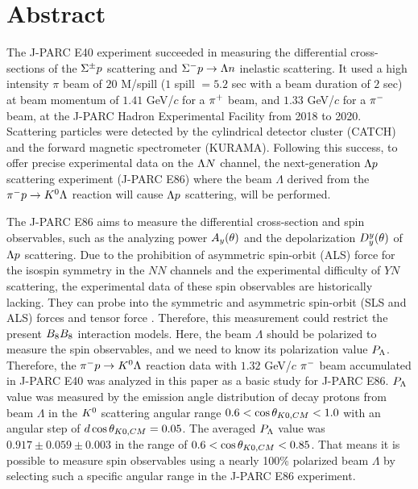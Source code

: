 %

\chapter{Abstract}
The J-PARC E40 experiment succeeded in measuring the differential cross-sections of the $\Sigma^{\pm}p$ scattering and $\Sigma^- p \to \Lambda n$ inelastic scattering. It used a high intensity $\pi$ beam of $20$ M/spill ($1$ spill $= 5.2$ sec with a beam duration of $2$ sec) at beam momentum of $1.41$ GeV/$c$ for a $\pi^{+}$ beam, and $1.33$ GeV/$c$ for a $\pi^{-}$ beam, at the J-PARC Hadron Experimental Facility from 2018 to 2020. Scattering particles were detected by the cylindrical detector cluster (CATCH) and the forward magnetic spectrometer (KURAMA). Following this success, to offer precise experimental data on the $\Lambda N$ channel, the next-generation $\Lambda p$ scattering experiment (J-PARC E86) where the beam $\Lambda$ derived from the $\pi^- p \to K^0 \Lambda$ reaction will cause $\Lambda p$ scattering, will be performed. 

The J-PARC E86 aims to measure the differential cross-section and spin observables, such as the analyzing power $A_{y}(\theta)$ and the depolarization $D^{y}_{y}(\theta)$ of $\Lambda p$ scattering. Due to the prohibition of asymmetric spin-orbit (ALS) force for the isospin symmetry in the $NN$ channels and the experimental difficulty of $YN$ scattering, the experimental data of these spin observables are historically lacking. They can probe into the symmetric and asymmetric spin-orbit (SLS and ALS) forces and tensor force \cite{Ishikawa-2004}. Therefore, this measurement could restrict the present $B_{8}B_{8}$ interaction models. Here, the beam $\Lambda$ should be polarized to measure the spin observables, and we need to know its polarization value $P_{\Lambda}$. Therefore, the $\pi^- p \to K^0 \Lambda$ reaction data with $1.32$ GeV/$c$ $\pi^{-}$ beam accumulated in J-PARC E40 was analyzed in this paper as a basic study for J-PARC E86. $P_{\Lambda}$ value was measured by the emission angle distribution of decay protons from beam $\Lambda$ in the $K^{0}$ scattering angular range $0.6<\cos{\theta_{K0,CM}}<1.0$ with an angular step of $d\cos{\theta_{K0,CM}}=0.05$. The averaged $P_{\Lambda}$ value was $0.917\pm0.059\pm0.003$ in the range of $0.6<\cos{\theta_{K0,CM}}<0.85$. That means it is possible to measure spin observables using a nearly 100\% polarized beam $\Lambda$ by selecting such a specific angular range in the J-PARC E86 experiment. 


